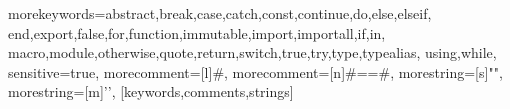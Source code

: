  
%
  {morekeywords={abstract,break,case,catch,const,continue,do,else,elseif,%
      end,export,false,for,function,immutable,import,importall,if,in,%
      macro,module,otherwise,quote,return,switch,true,try,type,typealias,%
      using,while},%
   sensitive=true,%
   morecomment=[l]\#,%
   morecomment=[n]{\#=}{=\#},%
   morestring=[s]{"}{"},%
   morestring=[m]{'}{'},%
}[keywords,comments,strings]%


